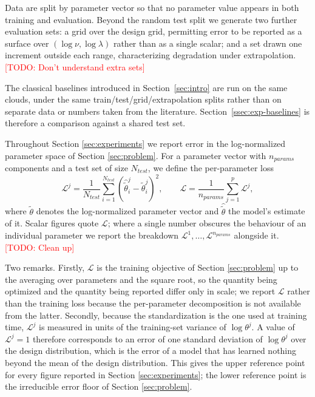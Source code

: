 \documentclass[11pt,letterpaper]{article}
\newcommand{\1}{\mathds{1}}
\newcommand{\todo}[1]{\textcolor{red}{[TODO: #1]}}
\newcommand{\fix}[1]{\textcolor{blue}{[FIX: #1]}}
\newcommand{\todo}[1]{}\newcommand{\fix}[1]{}
\theoremstyle{plain}
\theoremstyle{definitioncolon}
\begin{document}
Data are split by parameter vector so that no parameter
value appears in both training and evaluation. Beyond the random test split we
generate two further evaluation sets: a grid over the design grid, permitting
error to be reported as a surface over $(\log\nu, \log\lambda)$ rather than as a
single scalar; and a set drawn one increment outside each range, characterizing
degradation under extrapolation. \todo{Don't understand extra sets}

The classical baselines introduced in Section~\ref{sec:intro} are run on the same clouds,
under the same train/test/grid/extrapolation splits rather than on separate data
or numbers taken from the literature. Section~\ref{ssec:exp-baselines}
is therefore a comparison
against a shared  test set.

Throughout Section \ref{sec:experiments} we report error in the log-normalized
parameter space of Section \ref{sec:problem}. For a parameter vector with $n_{params}$
components and a test set of size $N_{test}$, we define the per-parameter loss
    \[
    \mathcal{L}^j = \frac{1}{N_{test}} \sum_{i=1}^{N_{test}}
    (\hat{\tilde\theta}^j_i - \tilde\theta^j_i)^2,
    \qquad
    \mathcal{L} = \frac{1}{n_{params}} \sum_{j=1}^{p} \mathcal{L}^j,
    \]
where $\tilde\theta$ denotes the log-normalized parameter vector and
$\hat{\tilde\theta}$ the model's estimate of it. Scalar figures quote
$\mathcal{L}$; where a single number obscures the behaviour of an individual
parameter we report the breakdown $\mathcal{L}^1, \dots, \mathcal{L}^{n_{params}}$
alongside it. \todo{Clean up}
 
Two remarks. Firstly, $\mathcal{L}$ is the training objective of Section
\ref{sec:problem} up to the averaging over parameters and the square root, so
the quantity being optimized and the quantity being reported differ only in
scale; we report $\mathcal{L}$ rather than the training loss because the
per-parameter decomposition is not available from the latter. Secondly, because
the standardization is the one used at training time, $\mathcal{L}^j$ is
measured in units of the training-set variance of $\log\theta^j$. A value of
$\mathcal{L}^j = 1$ therefore corresponds to an error of one standard deviation
of $\log\theta^j$ over the design distribution, which is the error of a model
that has learned nothing beyond the mean of the design distribution. This gives
the upper reference point for every figure reported in Section
\ref{sec:experiments}; the lower reference point is the irreducible error floor
of Section \ref{sec:problem}.
\end{document}
